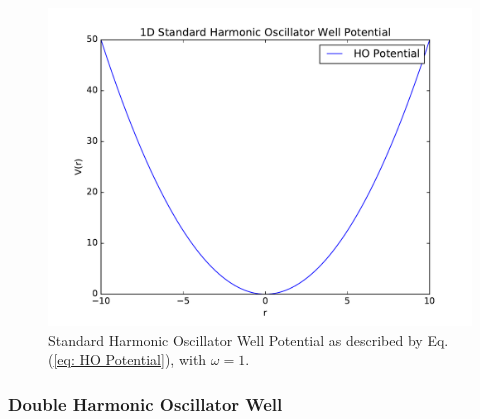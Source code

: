 \documentclass[../main.tex]{subfiles}
\begin{document}
\begin{figure}[!ht]
    \centering
    \includegraphics[scale=0.7]{figures/HO_Potential}
    \caption{Standard Harmonic Oscillator Well Potential as described by Eq.(\ref{eq: HO Potential}), with $\omega = 1$.}
    \label{fig: HO Potential}
\end{figure}



\subsubsection{Double Harmonic Oscillator Well}
\end{document}
